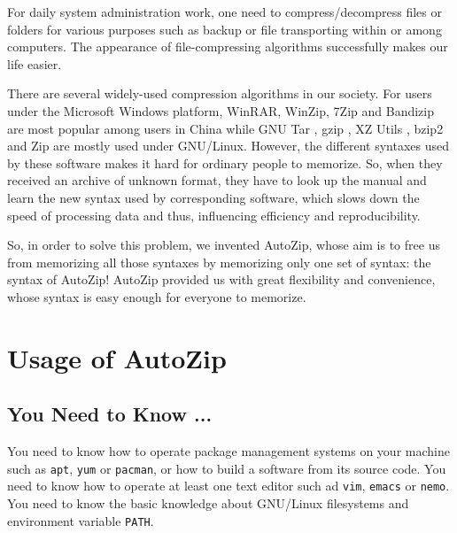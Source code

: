 \documentclass[fleqn,10pt]{SelfArx} %
\affiliation{\textsuperscript{1}\textit{Zhejiang University-University of Edinburgh Institute}}
\begin{document}
\sloppy{}\flushbottom \maketitle\tableofcontents\thispagestyle{empty}
\Introduction
For daily system administration work, one need to compress/decompress files or folders for various purposes such as backup or file transporting within or among computers. The appearance of file-compressing algorithms successfully makes our life easier.\par
There are several widely-used compression algorithms in our society. For users under the Microsoft Windows platform, WinRAR, WinZip, 7Zip and Bandizip are most popular among users in China while GNU Tar \cite{tar}, gzip \cite{gzip}, XZ Utils \cite{xz}, bzip2 \cite{bzip2} and Zip are mostly used under GNU/Linux. However, the different syntaxes used by these software makes it hard for ordinary people to memorize. So, when they received an archive of unknown format, they have to look up the manual and learn the new syntax used by corresponding software, which slows down the speed of processing data and thus, influencing efficiency and reproducibility.\par
So, in order to solve this problem, we invented AutoZip, whose aim is to free us from memorizing all those syntaxes by memorizing only one set of syntax: the syntax of AutoZip! AutoZip provided us with great flexibility and convenience, whose syntax is easy enough for everyone to memorize.
\section{Usage of AutoZip}
\subsection{You Need to Know ...}
You need to know how to operate package management systems on your machine such as \verb|apt|, \verb|yum| or \verb|pacman|, or how to build a software from its source code. You need to know how to operate at least one text editor such ad \verb|vim|, \verb|emacs| or \verb|nemo|. You need to know the basic knowledge about GNU/Linux filesystems and environment variable \verb|PATH|.
\end{document}
